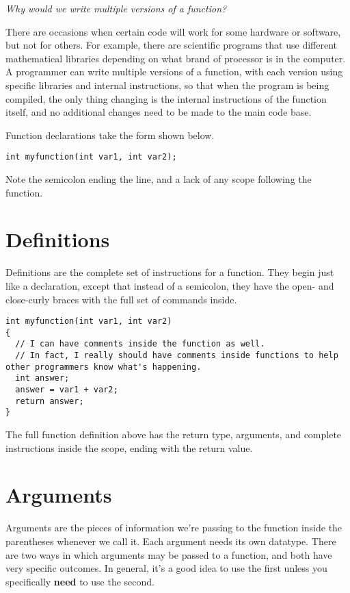 \textit{Why would we write multiple versions of a function?}

There are occasions when certain code will work for some hardware or software, but not for others.  For example, there are scientific programs that use different mathematical libraries depending on what brand of processor is in the computer.  A programmer can write multiple versions of a function, with each version using specific libraries and internal instructions, so that when the program is being compiled, the only thing changing is the internal instructions of the function itself, and no additional changes need to be made to the main code base.

Function declarations take the form shown below.

\begin{verbatim}
int myfunction(int var1, int var2);
\end{verbatim}

Note the semicolon ending the line, and a lack of any scope following the function.

\section{Definitions}
Definitions are the complete set of instructions for a function.  They begin just like a declaration, except that instead of a semicolon, they have the open- and close-curly braces with the full set of commands inside.

\begin{verbatim}
int myfunction(int var1, int var2)
{
  // I can have comments inside the function as well.
  // In fact, I really should have comments inside functions to help other programmers know what's happening.
  int answer;
  answer = var1 + var2;
  return answer;
}
\end{verbatim}

The full function definition above has the return type, arguments, and complete instructions inside the scope, ending with the return value.

\section{Arguments}
Arguments are the pieces of information we're passing to the function inside the parentheses whenever we call it.  Each argument needs its own datatype.  There are two ways in which arguments may be passed to a function, and both have very specific outcomes.  In general, it's a good idea to use the first unless you specifically \textbf{need} to use the second.

